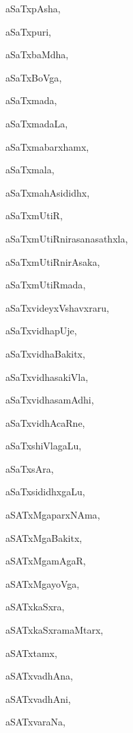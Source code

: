 \begin{multicols}{2}
{aSaTxpAsha}, \pageref{aSaTxpAsha}

{aSaTxpuri}, \pageref{aSaTxpuri}

{aSaTxbaMdha}, \pageref{aSaTxbaMdha}

{aSaTxBoVga}, \pageref{aSaTxBoVga}

{aSaTxmada}, \pageref{aSaTxmada}

{aSaTxmadaLa}, \pageref{aSaTxmadaLa}

{aSaTxmabarxhamx}, \pageref{aSaTxmabarxhamx}

{aSaTxmala}, \pageref{aSaTxmala}

{aSaTxmahAsididhx}, \pageref{aSaTxmahAsididhx}

{aSaTxmUtiR}, \pageref{aSaTxmUtiR}

{aSaTxmUtiRnirasanasathxla}, \pageref{aSaTxmUtiRnirasanasathxla}

{aSaTxmUtiRnirAsaka}, \pageref{aSaTxmUtiRnirAsaka}

{aSaTxmUtiRmada}, \pageref{aSaTxmUtiRmada}

{aSaTxvideyxVshavxraru}, \pageref{aSaTxvideyxVshavxraru}

{aSaTxvidhapUje}, \pageref{aSaTxvidhapUje}

{aSaTxvidhaBakitx}, \pageref{aSaTxvidhaBakitx}

{aSaTxvidhasakiVla}, \pageref{aSaTxvidhasakiVla}

{aSaTxvidhasamAdhi}, \pageref{aSaTxvidhasamAdhi}

{aSaTxvidhAcaRne}, \pageref{aSaTxvidhAcaRne}

{aSaTxshiVlagaLu}, \pageref{aSaTxshiVlagaLu}

{aSaTxsAra}, \pageref{aSaTxsAra}

{aSaTxsididhxgaLu}, \pageref{aSaTxsididhxgaLu}

{aSATxMgaparxNAma}, \pageref{aSATxMgaparxNAma}

{aSATxMgaBakitx}, \pageref{aSATxMgaBakitx}

{aSATxMgamAgaR}, \pageref{aSATxMgamAgaR}

{aSATxMgayoVga}, \pageref{aSATxMgayoVga}

{aSATxkaSxra}, \pageref{aSATxkaSxra}

{aSATxkaSxramaMtarx}, \pageref{aSATxkaSxramaMtarx}

{aSATxtamx}, \pageref{aSATxtamx}

{aSATxvadhAna}, \pageref{aSATxvadhAna}

{aSATxvadhAni}, \pageref{aSATxvadhAni}

{aSATxvaraNa}, \pageref{aSATxvaraNa}


\end{multicols}
